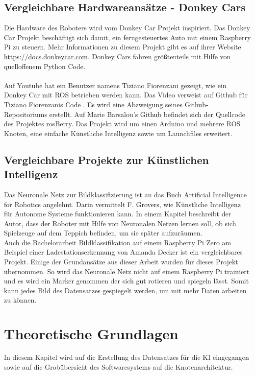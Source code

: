 \documentclass[conference]{IEEEtran}
\begin{document}
	\subsection{Vergleichbare Hardwareansätze - Donkey Cars} %
	Die Hardware des Roboters wird vom Donkey Car Projekt inspiriert.
	Das Donkey Car Projekt beschäftigt sich damit, ein ferngesteuertes Auto mit einem Raspberry Pi zu steuern.
	Mehr Informationen zu diesem Projekt gibt es auf ihrer Website 
	\url{https://docs.donkeycar.com}.
	Donkey Cars fahren größtenteils mit Hilfe von quelloffenem Python Code. \\
	\\
	Auf Youtube hat ein Benutzer namens Tiziano Fiorenzani gezeigt, wie ein Donkey Car mit ROS betrieben werden kann.
	Das Video \cite{fiorenzaniVideo} verweist auf Github für 
	Tiziano 
	Fiorenzanis Code \cite{fiorenzaniGitHub}. Es wird eine Abzweigung seines Github-Repositoriums 
	erstellt. Auf Marie Barsalou's Github \cite{barsalouGitHub} 	befindet sich der Quellcode des Projektes rosBerry. 
	Das Projekt wird um einen Arduino und mehrere ROS Knoten, eine 
	einfache Künstliche Intelligenz sowie um Launchfiles erweitert.
		
	\subsection{Vergleichbare Projekte zur Künstlichen Intelligenz} 
	Das Neuronale Netz zur Bildklassifizierung ist an das Buch \glqq Artificial Intelligence for Robotics\grqq  \cite{govers2018artificial} angelehnt.
	Darin vermittelt F. Grovers, wie Künstliche Intelligenz für Autonome 
	Systeme funktionieren kann.
	In einem Kapitel beschreibt der Autor, dass der Roboter mit Hilfe von Neuronalen Netzen lernen soll, ob sich Spielzeuge auf dem Teppich befinden, um sie später aufzuräumen.\\
	
	Auch die Bachelorarbeit \glqq Bildklassifikation auf einem Raspberry Pi 
	Zero am Beispiel einer Ladestationserkennung\grqq  \cite{Amanda} von 
	Amanda Decker ist ein vergleichbares Projekt.
	Einige der Grundansätze aus dieser Arbeit wurden für dieses Projekt übernommen.
	So wird das Neuronale Netz nicht auf einem Raspberry Pi trainiert und 
	es wird ein Marker genommen der sich gut rotieren und spiegeln lässt.
	Somit kann jedes Bild des Datensatzes gespiegelt werden, um mit mehr 
	Daten arbeiten zu können.
	
	\section{Theoretische Grundlagen}
	In diesem Kapitel wird auf die Erstellung des Datensatzes für die KI eingegangen sowie auf die Grobübersicht des Softwaresystems auf die Knotenarchitektur. %
	
\end{document}
